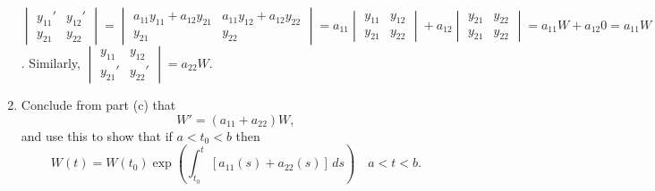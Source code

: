 \documentclass{ximera}
\begin{document}
\begin{problem}
\begin{enumerate}
\begin{solution}
    $
\begin{vmatrix}
y_{11}'&y_{12}'\\y_{21}&y_{22}
\end{vmatrix}=
\begin{vmatrix}
a_{11}y_{11}+a_{12}y_{21}&a_{11}y_{12}+a_{12}y_{22}\\
y_{21}&y_{22}
\end{vmatrix}=
a_{11}\begin{vmatrix}
y_{11}&y_{12}\\y_{21}&y_{22}
\end{vmatrix}
+a_{12}\begin{vmatrix}
y_{21}&y_{22}\\y_{21}&y_{22}
\end{vmatrix}=a_{11}W+a_{12}0=a_{11}W$.
Similarly,
$
\begin{vmatrix}
y_{11}&y_{12}\\y_{21}'&y_{22}'
\end{vmatrix}=a_{22}W$.
\end{solution}

\item %
 Conclude from part (c) that
$$
W'=(a_{11}+a_{22})W,
$$
and use this to show that if $a<t_0<b$  then
$$
W(t)=W(t_0)\exp\left(\int^t_{t_0} \left[a_{11}(s)+a_{22} (s)
\right]\, ds\right)\quad a<t<b.
$$
\end{enumerate}

\end{problem}
\end{document}

